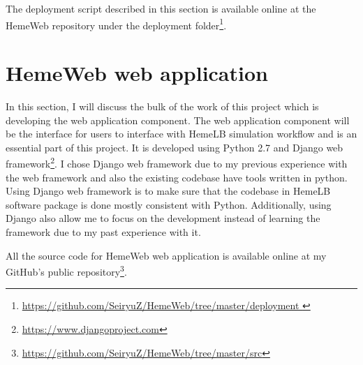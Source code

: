 The deployment script described in this section is available online at the HemeWeb repository under the deployment folder\footnote{\url{https://github.com/SeiryuZ/HemeWeb/tree/master/deployment }}.




\section{HemeWeb web application}

In this section, I will discuss the bulk of the work of this project which is developing the web application component. The web application component will be the interface for users to interface with HemeLB simulation workflow and is an essential part of this project. It is developed using Python 2.7 and Django web framework\footnote{\url{https://www.djangoproject.com}}. I chose Django web framework due to my previous experience with the web framework and also the existing codebase have tools written in python. Using Django web framework is to make sure that the codebase in HemeLB software package is done mostly consistent with Python. Additionally, using Django also allow me to focus on the development instead of learning the framework due to my past experience with it.

All the source code for HemeWeb web application is available online at my GitHub's public repository\footnote{\url{https://github.com/SeiryuZ/HemeWeb/tree/master/src}}.



